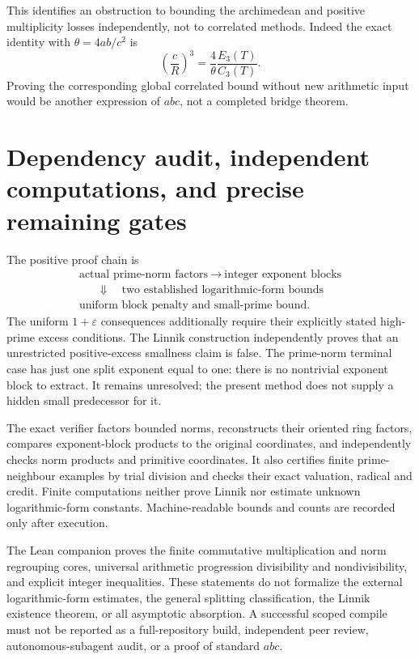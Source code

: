 This identifies an obstruction to bounding the archimedean and positive
multiplicity losses independently, not to correlated methods. Indeed the
exact identity with $\theta=4ab/c^2$ is
\[
 \left(\frac cR\right)^3
 =\frac4\theta\frac{E_3(T)}{C_3(T)}.
\]
Proving the corresponding global correlated bound without new arithmetic
input would be another expression of $abc$, not a completed bridge theorem.

\section{Dependency audit, independent computations, and precise remaining gates}
\label{sec:ep-audit}
The positive proof chain is
\[
\begin{gathered}
 \text{actual prime-norm factors}\ \longrightarrow\
 \text{integer exponent blocks}\\
 \mathrel{\phantom{\longrightarrow}}\Downarrow\quad
 \text{two established logarithmic-form bounds}\\
 \text{uniform block penalty and small-prime bound}.
\end{gathered}
\]
The uniform $1+\varepsilon$ consequences additionally require their explicitly
stated high-prime excess conditions. The Linnik construction independently
proves that an unrestricted positive-excess smallness claim is false.
The prime-norm terminal case has just one split exponent equal to one: there
is no nontrivial exponent block to extract. It remains unresolved; the present
method does not supply a hidden small predecessor for it.

The exact verifier factors bounded norms, reconstructs their oriented ring
factors, compares exponent-block products to the original coordinates, and
independently checks norm products and primitive coordinates. It also certifies
finite prime-neighbour examples by trial division and checks their exact
valuation, radical and credit. Finite computations neither prove Linnik nor
estimate unknown logarithmic-form constants. Machine-readable bounds and counts
are recorded only after execution.

The Lean companion proves the finite commutative multiplication and norm
regrouping cores, universal arithmetic progression divisibility and
nondivisibility, and explicit integer inequalities. These statements do not
formalize the external logarithmic-form estimates, the general splitting
classification, the Linnik existence theorem, or all asymptotic absorption.
A successful scoped compile must not be reported as a full-repository build,
independent peer review, autonomous-subagent audit, or a proof of standard $abc$.


